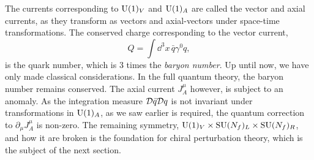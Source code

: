 The currents corresponding to $\mathrm{U}(1)_V$ and $\mathrm{U}(1)_A$ are called the vector and axial currents, as they transform as vectors and axial-vectors under space-time transformations.
The conserved charge corresponding to the vector current,
\begin{equation}
    Q = \int \dd^3 x \, \bar q \gamma^0 q,
\end{equation}
is the quark number, which is $3$ times the \emph{baryon number}.
Up until now, we have only made classical considerations.
In the full quantum theory, the baryon number remains conserved.
The axial current $J^\mu_A$ however, is subject to an anomaly.
As the integration measure $\mathcal{D}\bar q \mathcal{D} q$ is not invariant under transformations in $\mathrm{U}(1)_A$, as we saw earlier is required, the quantum correction to $\partial_\mu J^\mu_A$ is non-zero.
The remaining symmetry, $\mathrm{U}(1)_V \times \mathrm{SU}(N_f)_L \times \mathrm{SU}(N_f)_R$, and how it are broken is the foundation for chiral perturbation theory, which is the subject of the next section.
